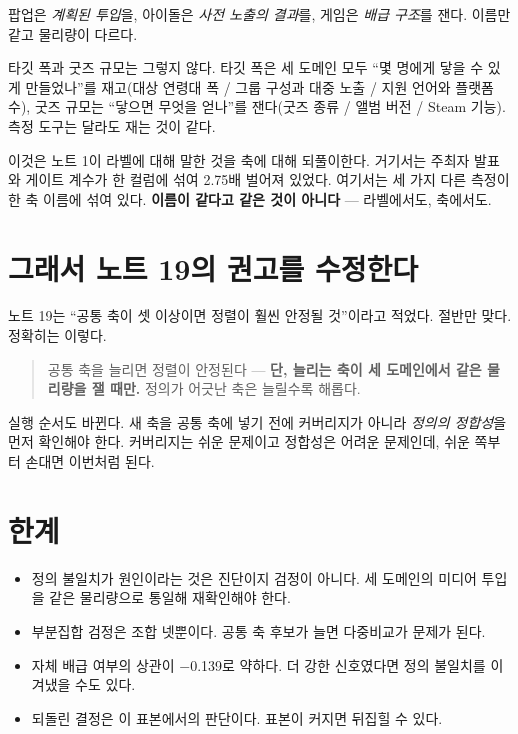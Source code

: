 \documentclass[10pt]{article}
\begin{document}
팝업은 \emph{계획된 투입}을, 아이돌은 \emph{사전 노출의 결과}를, 게임은
\emph{배급 구조}를 잰다. 이름만 같고 물리량이 다르다.

타깃 폭과 굿즈 규모는 그렇지 않다. 타깃 폭은 세 도메인 모두 ``몇 명에게 닿을 수
있게 만들었나''를 재고(대상 연령대 폭 / 그룹 구성과 대중 노출 / 지원 언어와
플랫폼 수), 굿즈 규모는 ``닿으면 무엇을 얻나''를 잰다(굿즈 종류 / 앨범 버전 /
Steam 기능). 측정 도구는 달라도 재는 것이 같다.


이것은 노트 1이 라벨에 대해 말한 것을 축에 대해 되풀이한다. 거기서는 주최자 발표와
게이트 계수가 한 컬럼에 섞여 2.75배 벌어져 있었다. 여기서는 세 가지 다른 측정이
한 축 이름에 섞여 있다. \textbf{이름이 같다고 같은 것이 아니다} --- 라벨에서도,
축에서도.

\section{그래서 노트 19의 권고를 수정한다}

노트 19는 ``공통 축이 셋 이상이면 정렬이 훨씬 안정될 것''이라고 적었다. 절반만
맞다. 정확히는 이렇다.

\begin{quote}\fontsize{9.5}{11.5}\selectfont
공통 축을 늘리면 정렬이 안정된다 --- \textbf{단, 늘리는 축이 세 도메인에서 같은
물리량을 잴 때만.} 정의가 어긋난 축은 늘릴수록 해롭다.
\end{quote}

실행 순서도 바뀐다. 새 축을 공통 축에 넣기 전에 커버리지가 아니라 \emph{정의의
정합성}을 먼저 확인해야 한다. 커버리지는 쉬운 문제이고 정합성은 어려운 문제인데,
쉬운 쪽부터 손대면 이번처럼 된다.

\section{한계}

\begin{itemize}[leftmargin=1.1em,itemsep=0.15em]
\item 정의 불일치가 원인이라는 것은 진단이지 검정이 아니다. 세 도메인의 미디어
      투입을 같은 물리량으로 통일해 재확인해야 한다.
\item 부분집합 검정은 조합 넷뿐이다. 공통 축 후보가 늘면 다중비교가 문제가 된다.
\item 자체 배급 여부의 상관이 $-$0.139로 약하다. 더 강한 신호였다면 정의 불일치를
      이겨냈을 수도 있다.
\item 되돌린 결정은 이 표본에서의 판단이다. 표본이 커지면 뒤집힐 수 있다.
\end{itemize}
\end{document}
